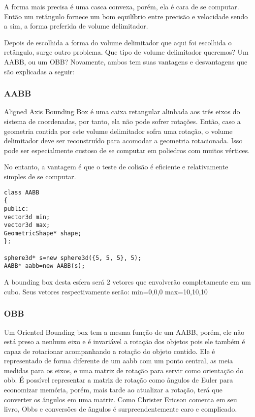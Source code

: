 A forma mais precisa é uma casca convexa, porém, ela é cara de se computar.
Então um retângulo fornece um bom equilíbrio entre precisão e velocidade sendo
a sim, a forma preferida de volume delimitador.

Depois de escolhida a forma do volume delimitador que aqui foi escolhida o
retângulo, surge outro problema. Que tipo de volume delimitador queremos? Um
AABB, ou um OBB? Novamente, ambos tem suas vantagens e desvantagens que são
explicadas a seguir:

\subsubsection{AABB}
Aligned Axis Bounding Box é uma caixa retangular alinhada aos três eixos do
sistema de coordenadas, por tanto, ela não pode sofrer rotações. Então, caso a
geometria contida por este volume delimitador sofra uma rotação, o volume
delimitador deve ser reconstruído para acomodar a geometria rotacionada. Isso
pode ser especialmente custoso de se computar em poliedros com muitos vértices.

No entanto, a vantagem é que o teste de colisão é eficiente e relativamente
simples de se computar.

\begin{lstlisting}[frame=single,caption=Código de exemplo\label{codigo1}]
class AABB
{
public:
vector3d min;
vector3d max;
GeometricShape* shape;
};

sphere3d* s=new sphere3d({5, 5, 5}, 5);
AABB* aabb=new AABB(s);
\end{lstlisting}

A bounding box desta esfera será 2 vetores que envolverão completamente em um cubo.
Seus vetores respectivamente serão:
min={0,0,0}
max={10,10,10}


\subsubsection{OBB}

Um Oriented Bounding box tem a mesma função de um AABB, porém, ele não está
preso a nenhum eixo e é invariável a rotação dos objetos pois ele também é
capaz de rotacionar acompanhando a rotação do objeto contido. Ele é
representado de forma diferente de um aabb com um ponto central, as meia
medidas para os eixos, e uma matriz de rotação para servir como orientação do
obb. É possível representar a matriz de rotação como ângulos de Euler para
economizar memória, porém, mais tarde ao atualizar a rotação, terá que
converter os ângulos em uma matriz. Como Christer Ericson comenta em seu livro,
Obbs e conversões de ângulos é surpreendentemente caro e complicado.

